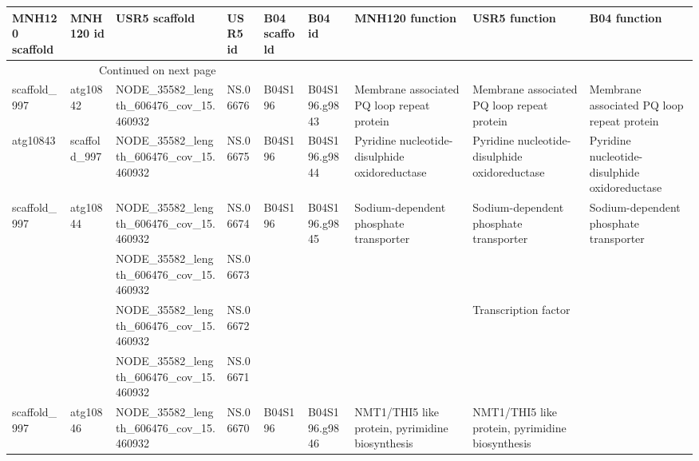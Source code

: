 \begin{longtable}{lllllllll}
\toprule
MNH120 scaffold &     MNH120 id &                           USR5 scaffold &               USR5 id & B04 scaffold &         B04 id &                                  MNH120 function &                                    USR5 function &                                   B04 function \\
\midrule
\endhead
\midrule
\multicolumn{3}{r}{{Continued on next page}} \\
\midrule
\endfoot

\bottomrule
\endlastfoot
   scaffold\_997 &      atg10842 &  NODE\_35582\_length\_606476\_cov\_15.460932 &              NS.06676 &      B04S196 &  B04S196.g9843 &       Membrane associated PQ loop repeat protein &       Membrane associated PQ loop repeat protein &     Membrane associated PQ loop repeat protein \\
       atg10843 &  scaffold\_997 &  NODE\_35582\_length\_606476\_cov\_15.460932 &              NS.06675 &      B04S196 &  B04S196.g9844 &    Pyridine nucleotide-disulphide oxidoreductase &    Pyridine nucleotide-disulphide oxidoreductase &  Pyridine nucleotide-disulphide oxidoreductase \\
   scaffold\_997 &      atg10844 &  NODE\_35582\_length\_606476\_cov\_15.460932 &              NS.06674 &      B04S196 &  B04S196.g9845 &           Sodium-dependent phosphate transporter &           Sodium-dependent phosphate transporter &         Sodium-dependent phosphate transporter \\
                &               &  NODE\_35582\_length\_606476\_cov\_15.460932 &              NS.06673 &              &                &                                                  &                                                  &                                                \\
                &               &  NODE\_35582\_length\_606476\_cov\_15.460932 &              NS.06672 &              &                &                                                  &                             Transcription factor &                                                \\
                &               &  NODE\_35582\_length\_606476\_cov\_15.460932 &              NS.06671 &              &                &                                                  &                                                  &                                                \\
   scaffold\_997 &      atg10846 &  NODE\_35582\_length\_606476\_cov\_15.460932 &              NS.06670 &      B04S196 &  B04S196.g9846 &  NMT1/THI5 like protein, pyrimidine biosynthesis &  NMT1/THI5 like protein, pyrimidine biosynthesis &                                                \\

\end{longtable}
